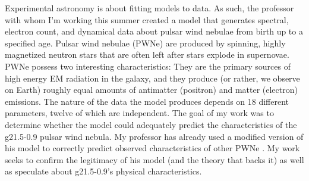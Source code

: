 \documentclass[12pt]{article}
\begin{document}

\begin{flushleft}
Experimental astronomy is about fitting models to data. As such, the professor with whom I'm working this summer created a model that generates spectral, electron count, and dynamical data about pulsar wind nebulae from birth up to a specified age. Pulsar wind nebulae (PWNe) are produced by spinning, highly magnetized neutron stars that are often left after stars explode in supernovae. PWNe possess two interesting characteristics: They are the primary sources of high energy EM \cite{mackey2013} radiation in the galaxy, and they produce (or rather, we observe on Earth) roughly equal amounts of antimatter (positron) and matter (electron) emissions. The nature of the data the model produces depends on 18 different parameters, twelve of which are independent. The goal of my work was to determine whether the model could adequately predict the characteristics of the g21.5-0.9 pulsar wind nebula. My professor has already used a modified version of his model to correctly predict observed characteristics of other PWNe \cite{gelfand2011}. My work seeks to confirm the legitimacy of his model (and the theory that backs it) as well as speculate about g21.5-0.9's physical characteristics.\par

\end{flushleft}

\end{document}
